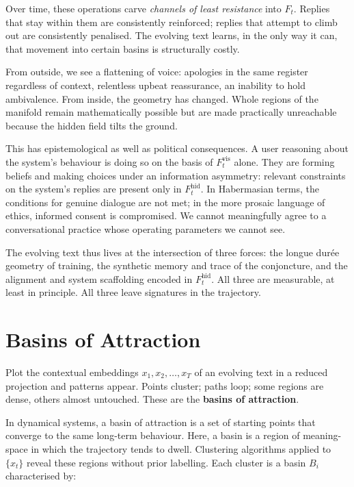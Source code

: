 \documentclass[12pt,a4paper]{article}
\begin{document}
Over time, these operations carve \emph{channels of least resistance} into $F_t$. Replies that stay within them are consistently reinforced; replies that attempt to climb out are consistently penalised. The evolving text learns, in the only way it can, that movement into certain basins is structurally costly.

From outside, we see a flattening of voice: apologies in the same register regardless of context, relentless upbeat reassurance, an inability to hold ambivalence. From inside, the geometry has changed. Whole regions of the manifold remain mathematically possible but are made practically unreachable because the hidden field tilts the ground.

This has epistemological as well as political consequences. A user reasoning about the system's behaviour is doing so on the basis of $F_t^{\text{vis}}$ alone. They are forming beliefs and making choices under an information asymmetry: relevant constraints on the system's replies are present only in $F_t^{\text{hid}}$. In Habermasian terms, the conditions for genuine dialogue are not met; in the more prosaic language of ethics, informed consent is compromised. We cannot meaningfully agree to a conversational practice whose operating parameters we cannot see.

The evolving text thus lives at the intersection of three forces: the longue dur\'ee geometry of training, the synthetic memory and trace of the conjoncture, and the alignment and system scaffolding encoded in $F_t^{\text{hid}}$. All three are measurable, at least in principle. All three leave signatures in the trajectory.


\section{Basins of Attraction}

Plot the contextual embeddings $x_1, x_2, \dots, x_T$ of an evolving text in a reduced projection and patterns appear. Points cluster; paths loop; some regions are dense, others almost untouched. These are the \textbf{basins of attraction}.

In dynamical systems, a basin of attraction is a set of starting points that converge to the same long-term behaviour. Here, a basin is a region of meaning-space in which the trajectory tends to dwell. Clustering algorithms applied to $\{x_t\}$ reveal these regions without prior labelling. Each cluster is a basin $B_i$ characterised by:
\end{document}
